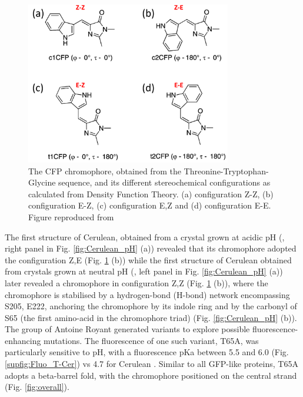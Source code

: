 \begin{figure}[ht] %
    \centering
    \noindent \includegraphics[width=0.8\textwidth]{images/T-Cer/CFP_isomeres.pdf}
    \hfill
    \caption{The CFP chromophore, obtained from the Threonine-Tryptophan-Glycine sequence, and its different stereochemical configurations as calculated from Density Function Theory. (a) configuration Z-Z, (b) configuration E-Z, (c) configuration E,Z and (d) configuration E-E. Figure reproduced from \cite{volianiCisTransPhotoisomerizationFluorescentProtein2008}}
    \label{fig:CFP_isomere}
\end{figure}
The first structure of Cerulean, obtained from a crystal grown at acidic pH (\cite{maloXrayStructureCerulean2007}, right panel in Fig. \ref{fig:Cerulean_pH} (a)) revealed that its chromophore adopted the configuration Z,E (Fig. \ref{fig:CFP_isomere} (b)) while the first structure of Cerulean obtained from crystals grown at neutral pH  (\cite{lelimousinIntrinsicDynamicsECFP2009}, left panel in Fig. \ref{fig:Cerulean_pH} (a)) later revealed a chromophore in configuration Z,Z (Fig. \ref{fig:CFP_isomere} (b)), where the chromophore is stabilised by a hydrogen-bond (H-bond) network encompassing S205, E222, anchoring the chromophore by its indole ring and by the carbonyl of S65 (the first amino-acid in the chromophore triad) (Fig. \ref{fig:Cerulean_pH} (b)).  The group of Antoine Royant generated variants to explore possible fluorescence-enhancing mutations. The fluorescence of one such variant, T65A, was particularly sensitive to pH, with a fluorescence pKa between 5.5 and 6.0 (Fig. \ref{supfig:Fluo_T-Cer}) vs 4.7 for Cerulean \parencite{rizzoImprovedCyanFluorescent2004}.  Similar to all GFP-like proteins, T65A adopts a beta-barrel fold, with the chromophore positioned on the central strand (Fig. \ref{fig:overall}). 

